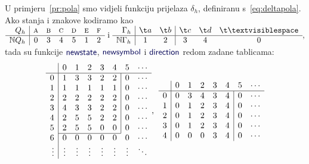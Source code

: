 \begin{primjer}[{name=[kodirana tablica prijelaza]}]\label{pr:polatable}
U primjeru~\ref{pr:pola} smo vidjeli funkciju prijelaza $\delta_h$, definiranu s~\eqref{eq:deltapola}. Ako stanja i znakove kodiramo kao
$
    \begin{array}{r|cccccc}
         Q_h& \textsc a& \textsc b& \textsc c& \textsc d& \textsc e& \textsc f \\\hline
         \N Q_h& 0 & 3 & 4 & 5 & 1 & 2
    \end{array}\text{ i }
    \begin{array}{r|cc|ccc}
        \Gamma_h& \t a & \t b & \t c & \t d & \bl \\\hline
        \N\Gamma_h & 1 & 2 & 3 & 4 & 0
    \end{array}\text,
    $
tada su funkcije $\f{newstate}$, $\f{newsymbol}$ i $\f{direction}$ redom zadane tablicama:
\begin{equation*}
\begin{array}{r|ccccccc}
    &0&1&2&3&4&5&\cdots\\\hline
0& 1 & 3 & 3 & 2 & 2 & \multicolumn{1}{|c}{0} & \cdots\\
1& 1 & 1 & 1 & 1 & 1 & \multicolumn{1}{|c}{0} & \cdots\\
2& 2 & 2 & 2 & 2 & 2 & \multicolumn{1}{|c}{0} & \cdots\\
3& 4 & 3 & 3 & 2 & 2 & \multicolumn{1}{|c}{0} & \cdots\\
4& 2 & 5 & 5 & 2 & 2 & \multicolumn{1}{|c}{0} & \cdots\\
5& 2 & 5 & 5 & 0 & 0 & \multicolumn{1}{|c}{0} & \cdots\\ \cline{2-6}
6& 0 & 0 & 0 & 0 & 0 & 0 & \cdots\\
\vdots&\vdots&\vdots&\vdots&\vdots&\vdots&\vdots&\ddots
\end{array}\text,\;\;
\begin{array}{r|ccccccc}
    &0&1&2&3&4&5&\cdots\\\hline
0& 0 & 3 & 4 & 3 & 4 & \multicolumn{1}{|c}{0} & \cdots\\
1& 0 & 1 & 2 & 3 & 4 & \multicolumn{1}{|c}{0} & \cdots\\
2& 0 & 1 & 2 & 3 & 4 & \multicolumn{1}{|c}{0} & \cdots\\
3& 0 & 1 & 2 & 3 & 4 & \multicolumn{1}{|c}{0} & \cdots\\
4& 0 & 0 & 0 & 3 & 4 & \multicolumn{1}{|c}{0} & \cdots\\

\end{array}
\end{equation*}
\end{primjer}
